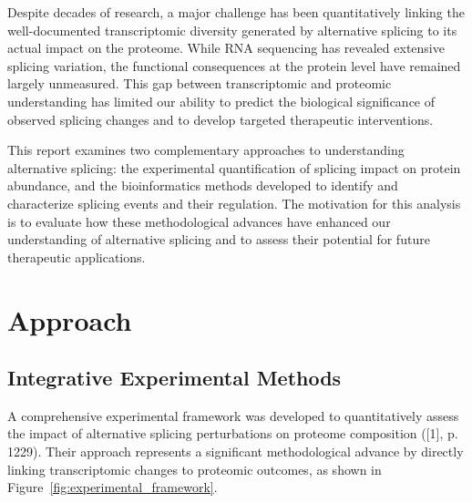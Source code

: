 \documentclass[12pt,a4paper]{article}
\begin{document}
Despite decades of research, a major challenge has been quantitatively linking the well-documented transcriptomic diversity generated by alternative splicing to its actual impact on the proteome. While RNA sequencing has revealed extensive splicing variation, the functional consequences at the protein level have remained largely unmeasured. This gap between transcriptomic and proteomic understanding has limited our ability to predict the biological significance of observed splicing changes and to develop targeted therapeutic interventions.

This report examines two complementary approaches to understanding alternative splicing: the experimental quantification of splicing impact on protein abundance, and the bioinformatics methods developed to identify and characterize splicing events and their regulation. The motivation for this analysis is to evaluate how these methodological advances have enhanced our understanding of alternative splicing and to assess their potential for future therapeutic applications.

\section{Approach}

\subsection{Integrative Experimental Methods}

A comprehensive experimental framework was developed to quantitatively assess the impact of alternative splicing perturbations on proteome composition ([1], p. 1229). Their approach represents a significant methodological advance by directly linking transcriptomic changes to proteomic outcomes, as shown in Figure~\ref{fig:experimental_framework}.
\end{document}
